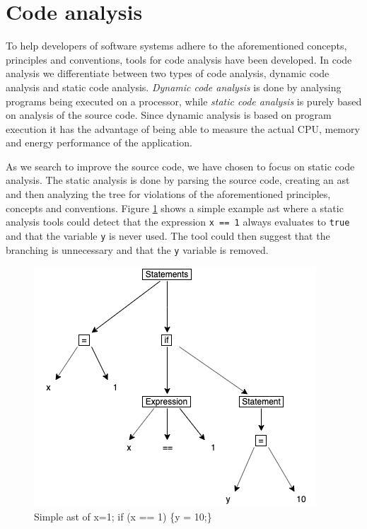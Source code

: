 \documentclass{report}
\begin{document}
\section{Code analysis}
To help developers of software systems adhere to the aforementioned concepts, principles and conventions, tools for code analysis have been developed. In code analysis we differentiate between two types of code analysis, dynamic code analysis and static code analysis. \textit{Dynamic code analysis} is done by analysing programs being executed on a processor, while \textit{static code analysis} is purely based on analysis of the source code. Since dynamic analysis is based on program execution it has the advantage of being able to measure the actual CPU, memory and energy performance of the application. 


As we search to improve the source code, we have chosen to focus on static code analysis. The static analysis is done by parsing the source code, creating an \gls{ast} and then analyzing the tree for violations of the aforementioned principles, concepts and conventions. Figure \ref{fig:ast} shows a simple example \gls{ast} where a static analysis tools could detect that the expression \texttt{x == 1} always evaluates to \texttt{true} and that the variable \texttt{y} is never used. The tool could then suggest that the branching is unnecessary and that the \texttt{y} variable is removed.  

\begin{figure}[h!]
	\centering
	\includegraphics[width=\linewidth/2]{report/images/ast.png}
	\caption{Simple \gls{ast} of x=1; if (x == 1) \{y = 10;\}}
	\label{fig:ast}
\end{figure}
\end{document}
